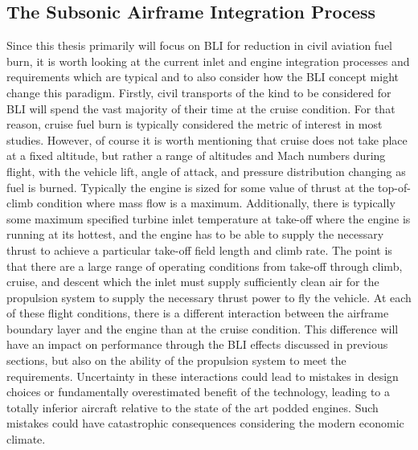 \documentclass[12pt]{gatech-thesis}
\begin{document}
\subsection{The Subsonic Airframe Integration Process}
\indent Since this thesis primarily will focus on BLI for reduction in civil aviation fuel burn, it is worth looking at the current inlet and engine integration processes and requirements which are typical and to also consider how the BLI concept might change this paradigm.  Firstly, civil transports of the kind to be considered for BLI will spend the vast majority of their time at the cruise condition.  For that reason, cruise fuel burn is typically considered the metric of interest in most studies.  However, of course it is worth mentioning that cruise does not take place at a fixed altitude, but rather a range of altitudes and Mach numbers during flight, with the vehicle lift, angle of attack, and pressure distribution changing as fuel is burned.  Typically the engine is sized for some value of thrust at the top-of-climb condition where mass flow is a maximum.  Additionally, there is typically some maximum specified turbine inlet temperature at take-off where the engine is running at its hottest, and the engine has to be able to supply the necessary thrust to achieve a particular take-off field length and climb rate.  The point is that there are a large range of operating conditions from take-off through climb, cruise, and descent which the inlet must supply sufficiently clean air for the propulsion system to supply the necessary thrust power to fly the vehicle.  At each of these flight conditions, there is a different interaction between the airframe boundary layer and the engine than at the cruise condition.  This difference will have an impact on performance through the BLI effects discussed in previous sections, but also on the ability of the propulsion system to meet the requirements.  Uncertainty in these interactions could lead to mistakes in design choices or fundamentally overestimated benefit of the technology, leading to a totally inferior aircraft relative to the state of the art podded engines.  Such mistakes could have catastrophic consequences considering the modern economic climate.
\end{document}
